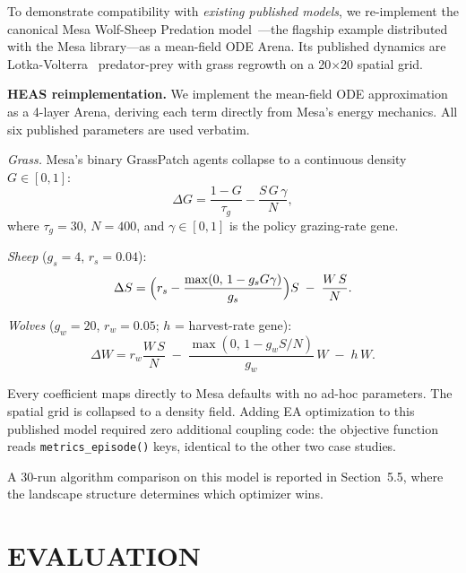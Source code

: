 \documentclass{wscpaperproc}
\begin{document}
To demonstrate compatibility with \emph{existing published models}, we
re-implement the canonical Mesa Wolf-Sheep Predation model~\cite{wilensky1997wolfsheep,kazil2020mesa}---the flagship example distributed with the Mesa library---as a mean-field ODE Arena.
Its published dynamics are Lotka-Volterra~\cite{lotka1925elements,volterra1926variazioni} predator-prey with grass regrowth on a
20$\times$20 spatial grid.

\textbf{HEAS reimplementation.} We implement the mean-field ODE approximation as a
4-layer Arena, deriving each term directly from Mesa's energy mechanics.
All six published parameters are used verbatim.

\textit{Grass.} Mesa's binary GrassPatch agents collapse to a continuous
density $G\in[0,1]$:
\begin{equation}
  \Delta G = \frac{1-G}{\tau_g} - \frac{S\,G\,\gamma}{N},
  \label{eq:grass}
\end{equation}
where $\tau_g\!=\!30$, $N\!=\!400$, and $\gamma\!\in\![0,1]$ is the policy
grazing-rate gene.

\textit{Sheep} ($g_s\!=\!4$, $r_s\!=\!0.04$):
\begin{equation}
  \Delta S = \Bigl(r_s - \frac{\max(0,\,1-g_s G\gamma)}{g_s}\Bigr)S
             \;-\; \frac{W\,S}{N}.
  \label{eq:sheep}
\end{equation}

\textit{Wolves} ($g_w\!=\!20$, $r_w\!=\!0.05$; $h$ = harvest-rate gene):
\begin{equation}
  \Delta W = r_w \frac{W\,S}{N}
             \;-\; \frac{\max(0,\,1-g_w S/N)}{g_w}\,W
             \;-\; h\,W.
  \label{eq:wolf}
\end{equation}

Every coefficient maps directly to Mesa defaults with no ad-hoc parameters. The
spatial grid is collapsed to a density field. Adding EA optimization to this
published model required zero additional coupling code: the objective function
reads \texttt{metrics\_episode()} keys, identical to the other two case studies.

A 30-run algorithm comparison on this model is reported in Section~5.5,
where the landscape structure determines which optimizer wins.

\section{EVALUATION}
\end{document}
